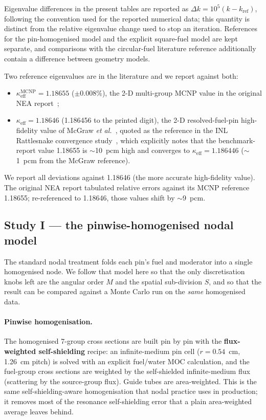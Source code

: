 \documentclass[11pt,a4paper]{article}
\newcommand{\keff}{\kappa_{\mathrm{eff}}}
\begin{document}
Eigenvalue differences in the present tables are reported as
$\Delta k=10^5(k-k_{\mathrm{ref}})$, following the convention used for the
reported numerical data; this quantity is distinct from the relative
eigenvalue change used to stop an iteration. References for the
pin-homogenised model and the explicit square-fuel model are kept
separate, and comparisons with the circular-fuel literature reference
additionally contain a difference between geometry models.

Two reference eigenvalues are in the literature and we report against both:
\begin{itemize}
\item $\keff^{\mathrm{MCNP}}=1.18655$ ($\pm0.008\%$), the 2-D multi-group
  MCNP value in the original NEA report~\cite{nea2003,smith2004};
\item $\keff=1.18646$ (1.186456 to the printed digit), the 2-D
  resolved-fuel-pin high-fidelity value of McGraw \emph{et
  al.}~\cite{mcgraw2014}, quoted as the reference in the INL Rattlesnake
  convergence study~\cite{rattlesnake}, which explicitly notes that the
  benchmark-report value 1.18655 is $\sim$10~pcm high and converges to
  $\keff=1.186446$ ($\sim$1~pcm from the McGraw reference).
\end{itemize}
We report all deviations against 1.18646 (the more accurate high-fidelity
value). The original NEA report tabulated relative errors against its MCNP
reference 1.18655; re-referenced to 1.18646, those values shift by
$\sim$9~pcm.

\subsection{Study I --- the pinwise-homogenised nodal model}

The standard nodal treatment folds each pin's fuel and moderator into a
single homogenised node. We follow that model here so that the only
discretisation knobs left are the angular order $M$ and the spatial
sub-division $S$, and so that the result can be compared against a Monte
Carlo run on the \emph{same} homogenised data.

\paragraph{Pinwise homogenisation.}
The homogenised 7-group cross sections are built pin by pin with the
\textbf{flux-weighted self-shielding} recipe: an infinite-medium pin
cell ($r=0.54$~cm, 1.26~cm pitch) is solved with an explicit fuel/water
MOC calculation, and the fuel-group cross sections are weighted by the
self-shielded infinite-medium flux (scattering by the source-group flux).
Guide tubes are area-weighted. This is the same self-shielding-aware
homogenisation that nodal practice uses in production; it removes most of
the resonance self-shielding error that a plain area-weighted average
leaves behind.
\end{document}
